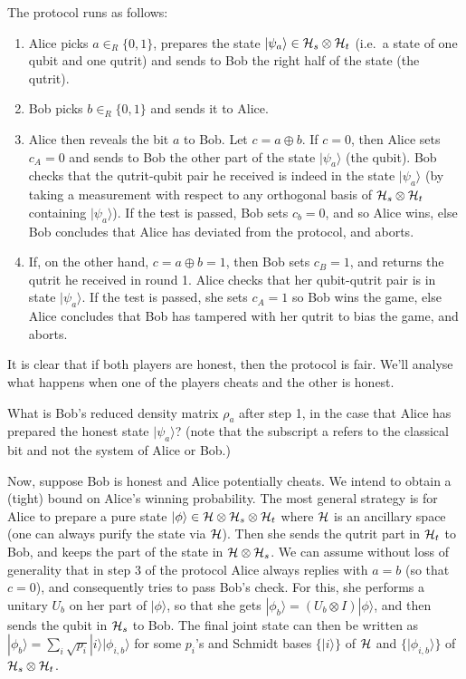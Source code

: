 \documentclass[a4paper,10pt,landscape,twocolumn]{scrartcl}
\newcommand{\ket}[1]{| #1 \rangle}
\begin{document}
\begin{exercise}
The protocol runs as follows:
\begin{enumerate}
\item Alice picks $a \in_R \{0,1\}$, prepares the state $\ket{\psi_a} \in \mathcal{H}_s \otimes \Hi_t$ (i.e.\ a state of one qubit and one qutrit) and sends to Bob the right half of the state (the qutrit).
\item Bob picks $b \in_R \{0,1\}$ and sends it to Alice.
\item Alice then reveals the bit $a$ to Bob. Let $c=a \oplus b$. If $c=0$, then Alice sets $c_A=0$ and sends to Bob the other part of the state $\ket{\psi_a}$ (the qubit). Bob checks that the qutrit-qubit pair he received is indeed in the state $\ket{\psi_a}$ (by taking a measurement with respect to any orthogonal basis of $\mathcal{H}_s \otimes \mathcal{H}_t$ containing $\ket{\psi_a}$). If the test is passed, Bob sets $c_b=0$, and so Alice wins, else Bob concludes that Alice has deviated from the protocol, and aborts.
\item If, on the other hand, $c=a \oplus b=1$, then Bob sets $c_B=1$, and returns the qutrit he received in round 1. Alice checks that her qubit-qutrit pair is in state $\ket{\psi_a}$. If the test is passed, she sets $c_A=1$ so Bob wins the game, else Alice concludes that Bob has tampered with her qutrit to bias the game, and aborts.
\end{enumerate}

It is clear that if both players are honest, then the protocol is fair. We'll analyse what happens when one of the players cheats and the other is honest.

\begin{subex}
What is Bob's reduced density matrix $\rho_a$ after step 1, in the case that Alice has prepared the honest state $\ket{\psi_a}$? (note that the subscript a refers to the classical bit and not the system of Alice or Bob.)
\end{subex}

\begin{subex}
Now, suppose Bob is honest and Alice potentially cheats. We intend to obtain a (tight) bound on Alice's winning probability. 
The most general strategy is for Alice to prepare a pure state $\ket{\phi} \in \Hi \otimes \Hi_s \otimes \Hi_t$ where $\mathcal{H}$ is an ancillary space (one can always purify the state via $\mathcal{H}$). Then she sends the qutrit part in $\mathcal{H}_t$ to Bob, and keeps the part of the state in $\mathcal{H} \otimes \mathcal{H}_s$. 
We can assume without loss of generality that in step 3 of the protocol Alice always replies with $a=b$ (so that $c=0$), and consequently tries to pass Bob's check. For this, she performs a unitary $U_b$ on her part of $\ket{\phi}$, so that she gets $\ket{\phi_b}=(U_b \otimes I) \ket{\phi}$, and then sends the qubit in $\mathcal{H}_s$ to Bob. The final joint state can then be written as $\ket{\phi_b} = \sum_i \sqrt{p_i} \ket{i} \ket{\phi_{i,b}}$ for some $p_i$'s and Schmidt bases $\{ \ket{i} \}$ of $\mathcal{H}$ and $\{ \ket{\phi_{i,b}} \}$ of $\mathcal{H}_s \otimes \mathcal{H}_t$. 


\end{subex}
\end{exercise}
\end{document}
